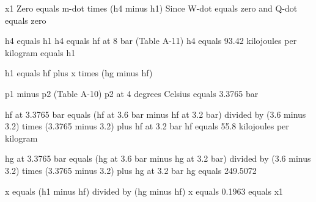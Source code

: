 x1  
Zero equals m-dot times (h4 minus h1)  
Since W-dot equals zero and Q-dot equals zero  

h4 equals h1  
h4 equals hf at 8 bar (Table A-11)  
h4 equals 93.42 kilojoules per kilogram equals h1  

h1 equals hf plus x times (hg minus hf)  

p1 minus p2 (Table A-10)  
p2 at 4 degrees Celsius equals 3.3765 bar  

hf at 3.3765 bar equals (hf at 3.6 bar minus hf at 3.2 bar) divided by (3.6 minus 3.2) times (3.3765 minus 3.2) plus hf at 3.2 bar  
hf equals 55.8 kilojoules per kilogram  

hg at 3.3765 bar equals (hg at 3.6 bar minus hg at 3.2 bar) divided by (3.6 minus 3.2) times (3.3765 minus 3.2) plus hg at 3.2 bar  
hg equals 249.5072  

x equals (h1 minus hf) divided by (hg minus hf)  
x equals 0.1963 equals x1